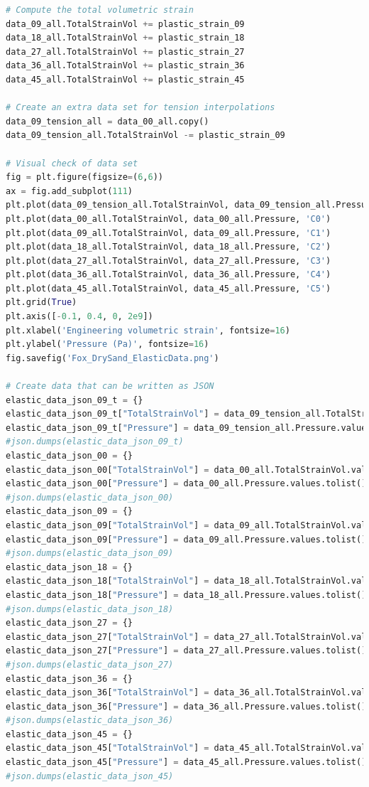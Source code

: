 \begin{lstlisting}[language=Python]
# Compute the total volumetric strain
data_09_all.TotalStrainVol += plastic_strain_09
data_18_all.TotalStrainVol += plastic_strain_18
data_27_all.TotalStrainVol += plastic_strain_27
data_36_all.TotalStrainVol += plastic_strain_36
data_45_all.TotalStrainVol += plastic_strain_45

# Create an extra data set for tension interpolations
data_09_tension_all = data_00_all.copy()
data_09_tension_all.TotalStrainVol -= plastic_strain_09

# Visual check of data set
fig = plt.figure(figsize=(6,6))
ax = fig.add_subplot(111)
plt.plot(data_09_tension_all.TotalStrainVol, data_09_tension_all.Pressure, 'C7')
plt.plot(data_00_all.TotalStrainVol, data_00_all.Pressure, 'C0')
plt.plot(data_09_all.TotalStrainVol, data_09_all.Pressure, 'C1')
plt.plot(data_18_all.TotalStrainVol, data_18_all.Pressure, 'C2')
plt.plot(data_27_all.TotalStrainVol, data_27_all.Pressure, 'C3')
plt.plot(data_36_all.TotalStrainVol, data_36_all.Pressure, 'C4')
plt.plot(data_45_all.TotalStrainVol, data_45_all.Pressure, 'C5')
plt.grid(True)
plt.axis([-0.1, 0.4, 0, 2e9])
plt.xlabel('Engineering volumetric strain', fontsize=16)
plt.ylabel('Pressure (Pa)', fontsize=16)
fig.savefig('Fox_DrySand_ElasticData.png')

# Create data that can be written as JSON
elastic_data_json_09_t = {}
elastic_data_json_09_t["TotalStrainVol"] = data_09_tension_all.TotalStrainVol.values.tolist()
elastic_data_json_09_t["Pressure"] = data_09_tension_all.Pressure.values.tolist()
#json.dumps(elastic_data_json_09_t)
elastic_data_json_00 = {}
elastic_data_json_00["TotalStrainVol"] = data_00_all.TotalStrainVol.values.tolist()
elastic_data_json_00["Pressure"] = data_00_all.Pressure.values.tolist()
#json.dumps(elastic_data_json_00)
elastic_data_json_09 = {}
elastic_data_json_09["TotalStrainVol"] = data_09_all.TotalStrainVol.values.tolist()
elastic_data_json_09["Pressure"] = data_09_all.Pressure.values.tolist()
#json.dumps(elastic_data_json_09)
elastic_data_json_18 = {}
elastic_data_json_18["TotalStrainVol"] = data_18_all.TotalStrainVol.values.tolist()
elastic_data_json_18["Pressure"] = data_18_all.Pressure.values.tolist()
#json.dumps(elastic_data_json_18)
elastic_data_json_27 = {}
elastic_data_json_27["TotalStrainVol"] = data_27_all.TotalStrainVol.values.tolist()
elastic_data_json_27["Pressure"] = data_27_all.Pressure.values.tolist()
#json.dumps(elastic_data_json_27)
elastic_data_json_36 = {}
elastic_data_json_36["TotalStrainVol"] = data_36_all.TotalStrainVol.values.tolist()
elastic_data_json_36["Pressure"] = data_36_all.Pressure.values.tolist()
#json.dumps(elastic_data_json_36)
elastic_data_json_45 = {}
elastic_data_json_45["TotalStrainVol"] = data_45_all.TotalStrainVol.values.tolist()
elastic_data_json_45["Pressure"] = data_45_all.Pressure.values.tolist()
#json.dumps(elastic_data_json_45)


\end{lstlisting}
